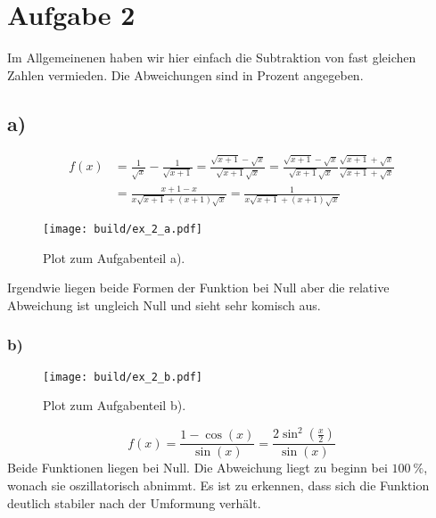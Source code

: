 \section*{Aufgabe 2}
Im Allgemeinenen haben wir hier einfach die Subtraktion von fast gleichen Zahlen vermieden.
Die Abweichungen sind in Prozent angegeben.
\subsection*{a)}
\begin{align*}
    f(x) &= \frac{1}{\sqrt{x}} - \frac{1}{\sqrt{x+1}}
    = \frac{\sqrt{x+1} - \sqrt{x}}{\sqrt{x+1}\sqrt{x}}
    = \frac{\sqrt{x+1} - \sqrt{x}}{\sqrt{x+1}\sqrt{x}} \frac{\sqrt{x+1} + \sqrt{x}}{\sqrt{x+1} + \sqrt{x}} \\
    &= \frac{x+1-x}{x \sqrt{x+1} + (x+1)\sqrt{x}}  =
    \frac{1}{x \sqrt{x+1} + (x+1)\sqrt{x}}
\end{align*}
\begin{figure}
    \centering
    \texttt{[image: build/ex\_2\_a.pdf]}
    \caption{Plot zum Aufgabenteil a).}
\end{figure}
Irgendwie liegen beide Formen der Funktion bei Null aber die relative Abweichung ist ungleich Null und sieht sehr komisch aus.
\FloatBarrier
\subsubsection*{b)}
\begin{figure}
    \centering
    \texttt{[image: build/ex\_2\_b.pdf]}
    \caption{Plot zum Aufgabenteil b).}
\end{figure}
\begin{equation*}
    f(x) = \frac{1- \cos (x)}{\sin (x)} = \frac{2\sin^2(\frac{x}{2})}{\sin(x)}
\end{equation*}
Beide Funktionen liegen bei Null.
Die Abweichung liegt zu beginn bei $\qty{100}{\percent}$, wonach sie oszillatorisch abnimmt.
Es ist zu erkennen, dass sich die Funktion deutlich stabiler nach der Umformung verhält.
\FloatBarrier

